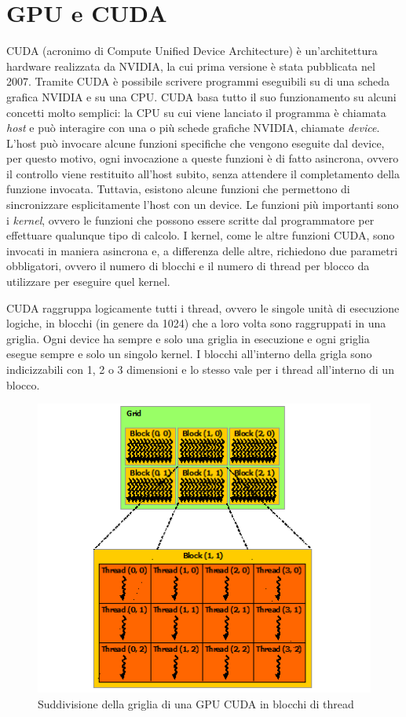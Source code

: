 \documentclass[12pt,a4paper]{book} %
\begin{document}
	\section{GPU e CUDA}
	CUDA (acronimo di Compute Unified Device Architecture) è un'architettura hardware realizzata da NVIDIA, la cui prima versione è stata pubblicata nel 2007. Tramite CUDA è possibile scrivere programmi eseguibili su di una scheda grafica NVIDIA e su una CPU. CUDA basa tutto il suo funzionamento su alcuni concetti molto semplici: la CPU su cui viene lanciato il programma è chiamata \textit{host} e può interagire con una o più schede grafiche NVIDIA, chiamate \textit{device}. L'host può invocare alcune funzioni specifiche che vengono eseguite dal device, per questo motivo, ogni invocazione a queste funzioni è di fatto asincrona, ovvero il controllo viene restituito all'host subito, senza attendere il completamento della funzione invocata. Tuttavia, esistono alcune funzioni che permettono di sincronizzare esplicitamente l'host con un device. Le funzioni più importanti sono i \textit{kernel}, ovvero le funzioni che possono essere scritte dal programmatore per effettuare qualunque tipo di calcolo. I kernel, come le altre funzioni CUDA, sono invocati in maniera asincrona e, a differenza delle altre, richiedono due parametri obbligatori, ovvero il numero di blocchi e il numero di thread per blocco da utilizzare per eseguire quel kernel.
	
	CUDA raggruppa logicamente tutti i thread, ovvero le singole unità di esecuzione logiche, in blocchi (in genere da 1024) che a loro volta sono raggruppati in una griglia. Ogni device ha sempre e solo una griglia in esecuzione e ogni griglia esegue sempre e solo un singolo kernel. I blocchi all'interno della grigla sono indicizzabili con 1, 2 o 3 dimensioni e lo stesso vale per i thread all'interno di un blocco.
	
	\begin{figure}[!ht]
		\centering
		\includegraphics[width=0.7\linewidth]{grid-of-thread-blocks}
		\caption[Struttura della griglia di una GPU CUDA]{Suddivisione della griglia di una GPU CUDA in blocchi di thread}
		\label{fig:grid-of-thread-blocks}
	\end{figure}
	
\end{document}
